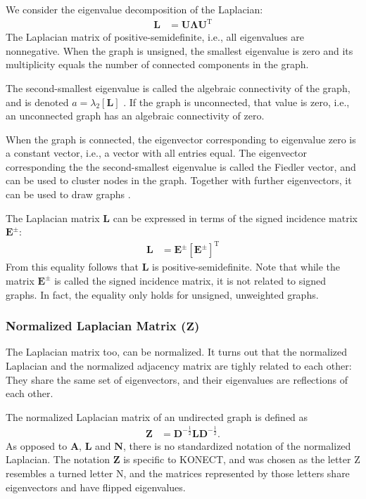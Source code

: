 \documentclass{article}
\begin{document}
We consider the eigenvalue decomposition of the Laplacian:
\begin{align}
  \mathbf L &= \mathbf U \mathbf \Lambda \mathbf U^{\mathrm T}
\end{align}
The Laplacian matrix of positive-semidefinite, i.e., all eigenvalues are
nonnegative.  
When the graph is unsigned, the smallest eigenvalue is zero and its
multiplicity equals the number of connected components in the graph. 

The second-smallest eigenvalue is called the algebraic connectivity of
the graph, and is denoted $a = \lambda_2[\mathbf L]$ \citep{b652}.  If the graph is
unconnected, that value is zero, i.e., an unconnected graph has an
algebraic connectivity of zero. 

When the graph is connected, the eigenvector corresponding to eigenvalue
zero is a constant vector, i.e., a vector with all entries equal. The
eigenvector corresponding the the second-smallest eigenvalue is called
the Fiedler vector, and can be used to cluster nodes in the
graph. Together with further eigenvectors, it can be used to draw
graphs \citep{kunegis:signed-kernels}. 

The Laplacian matrix $\mathbf L$ can be expressed in terms of the signed
incidence matrix $\mathbf E^{\pm}$:
\begin{align}
  \mathbf L &= \mathbf E^{\pm} [\mathbf E^{\pm}]^{\mathrm T}
\end{align}
From this equality follows that $\mathbf L$ is positive-semidefinite.   
Note that while the matrix $\mathbf E^{\pm}$ is called the signed
incidence matrix, it is not related to signed graphs.  In fact, the
equality only holds for unsigned, unweighted graphs. 

\subsubsection{Normalized Laplacian Matrix ($\mathbf Z$)}
\label{sec:matrix.Z}
The Laplacian matrix too, can be normalized.  It turns out that the
normalized Laplacian and the normalized adjacency matrix
are tighly related
to each other:  They share the same set of eigenvectors, and their
eigenvalues are reflections of each other.  

The normalized Laplacian matrix of an undirected graph is defined as 
\begin{align}
  \mathbf Z &= \mathbf D^{-\frac 1 2} \mathbf L \mathbf D^{-\frac 1 2}.
\end{align}
As opposed to $\mathbf A$, $\mathbf L$ and $\mathbf N$, there is no
standardized notation of the normalized Laplacian.  The notation
$\mathbf Z$ is specific to KONECT, and was chosen as the letter Z
resembles a turned letter N, and the matrices represented by those
letters share eigenvectors and have flipped eigenvalues. 
\end{document}
